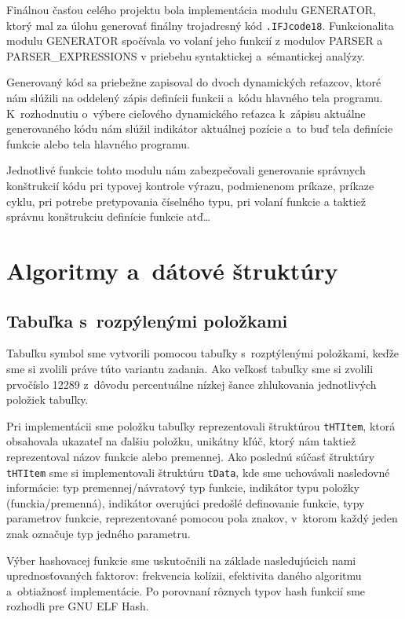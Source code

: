 \documentclass[a4paper, 11pt]{article}
\begin{document}
Finálnou časťou celého projektu bola implementácia modulu GENERATOR, ktorý mal za úlohu generovať finálny trojadresný kód \texttt{.IFJcode18}. 
Funkcionalita modulu GENERATOR spočívala vo volaní jeho funkcií z modulov PARSER a 
PARSER\_EXPRESSIONS v priebehu syntaktickej a~sémantickej analýzy.

Generovaný kód sa priebežne zapisoval do dvoch dynamických reťazcov, ktoré nám slúžili na oddelený zápis definícii funkcii a~kódu hlavného tela programu. K~rozhodnutiu o~výbere cieľového dynamického reťazca k~zápisu aktuálne generovaného kódu nám slúžil indikátor aktuálnej pozície a~to buď tela definície funkcie alebo tela hlavného programu.

Jednotlivé funkcie tohto modulu nám zabezpečovali generovanie správnych konštrukcií kódu pri typovej kontrole výrazu, podmienenom príkaze, príkaze cyklu, pri potrebe pretypovania číselného typu, pri volaní funkcie a taktiež správnu konštrukciu definície funkcie atď\dots
\newpage
\section{Algoritmy a~dátové štruktúry}
\subsection{Tabuľka s~rozpýlenými položkami}

Tabuľku symbol sme vytvorili pomocou tabuľky s~rozptýlenými položkami, keďže sme si zvolili práve túto variantu zadania. Ako veľkosť tabuľky sme si zvolili prvočíslo 12289 z~dôvodu  percentuálne nízkej šance zhlukovania jednotlivých položiek tabuľky.    

Pri implementácii sme položku tabuľky reprezentovali štruktúrou \texttt{tHTItem}, ktorá obsahovala ukazateľ na ďalšiu položku, unikátny kľúč, ktorý nám taktiež reprezentoval názov funkcie alebo premennej. Ako poslednú súčasť štruktúry \texttt{tHTItem} sme si implementovali štruktúru \texttt{tData}, kde sme uchovávali nasledovné informácie: typ premennej/návratový typ funkcie, indikátor typu položky (funckia/premenná), indikátor overujúci predošlé definovanie funkcie, typy parametrov funkcie,  reprezentované pomocou pola znakov, v~ktorom každý jeden znak označuje typ jedného parametru.

Výber hashovacej funkcie sme uskutočnili na základe nasledujúcich nami uprednosťovaných faktorov: frekvencia kolízii, efektivita daného algoritmu a~obtiažnosť implementácie. Po porovnaní rôznych typov hash funkcií sme rozhodli pre GNU ELF Hash.
\end{document}
